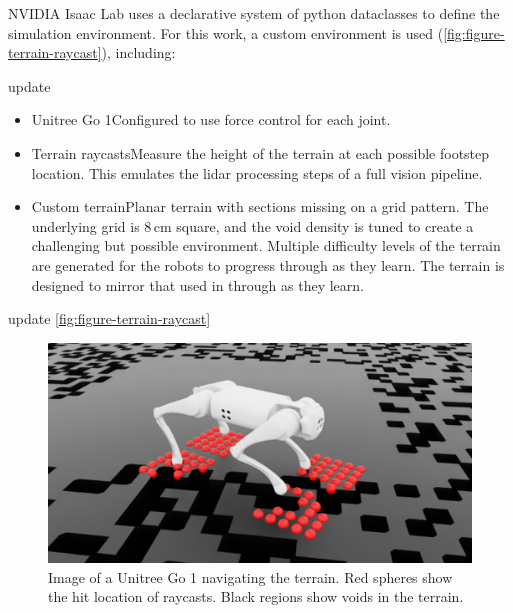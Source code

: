 NVIDIA Isaac Lab uses a declarative system of python dataclasses to
define the simulation environment. For this work, a custom
environment is used (\autoref{fig:figure-terrain-raycast}), including:

\begin{todo}
  update
\end{todo}

\begin{itemize}
  \item Unitree Go 1\textemdash Configured to use force control for each joint.
  \item Terrain raycasts\textemdash Measure the height of the terrain
    at each possible footstep location. This emulates the lidar
    processing steps of a full vision pipeline.
  \item Custom terrain\textemdash Planar terrain with sections
    missing on a grid pattern. The underlying grid is 8\,cm square,
    and     the void density is tuned to create a challenging but
    possible     environment. Multiple difficulty levels of the
    terrain are generated     for the robots to progress through as
    they learn.     The terrain is designed to mirror that used in
    \cite{bratta_contactnet_2024}
    through as they learn.
\end{itemize}

\begin{todo}
  update \autoref{fig:figure-terrain-raycast}
\end{todo}

\begin{figure}[H]
  \centering
  \includegraphics[width=0.75\linewidth]{images/figures/terrain-raycast.png}
  \caption{Image of a Unitree Go 1 navigating the terrain. Red
    spheres show the hit location of raycasts. Black regions show voids
  in the terrain.}
  \label{fig:figure-terrain-raycast}
\end{figure}
